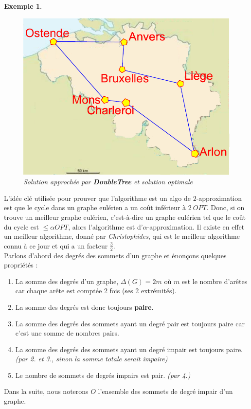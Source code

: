 \documentclass{article}
\newtheorem{exemple}{Exemple}[section]
\begin{document}
\begin{sffamily}
\begin{exemple}
\begin{figure}[h!]
\begin{center}
    \includegraphics[scale=0.5]{belgiqueOPT.pdf}
    \caption{Solution approchée par \textbf{DoubleTree} et solution optimale}
    \end{center}
\end{figure}
\end{exemple}

L'idée clé utilisée pour prouver que l'algorithme est un algo de $2$-approximation est que le cycle dans un graphe eulérien a un coût 
inférieur à $2\ OPT$. Donc, si on trouve un meilleur graphe eulérien, c'est-à-dire un graphe eulérien tel que le coût du cycle est $\leq 
\alpha OPT$, alors l'algorithme est d'$\alpha$-approximation. Il existe en effet un meilleur algorithme, donné par \textit{Christophides}, 
qui est le meilleur algorithme connu à ce jour et qui a un facteur $\frac 3 2$. \\
Parlons d'abord des degrés des sommets d'un graphe et énonçons quelques propriétés :
\begin{enumerate}
\item La somme des degrés d'un graphe, $\Delta(G) = 2m$ où $m$ est le nombre d'arêtes car chaque arête est comptée 2 fois (ses 2 
extrémités).
\item La somme des degrés est donc toujours \textbf{paire}.
\item La somme des degrés des sommets ayant un degré pair est toujours paire car c'est une somme de nombres pairs.
\item La somme des degrés des sommets ayant un degré impair est toujours paire. \textit{(par 2. et 3., sinon la somme totale serait 
impaire)}
\item Le nombre de sommets de degrés impairs est pair. \textit{(par 4.)}
\end{enumerate}
Dans la suite, nous noterons $O$ l'ensemble des sommets de degré impair d'un graphe.


\end{sffamily}
\end{document}
